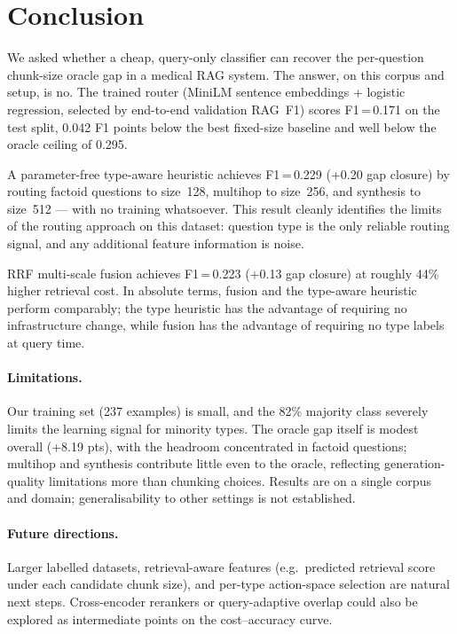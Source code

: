 \documentclass{article}
\begin{document}
\section{Conclusion}

We asked whether a cheap, query-only classifier can recover the per-question
chunk-size oracle gap in a medical RAG system. The answer, on this corpus
and setup, is no. The trained router (MiniLM sentence embeddings + logistic
regression, selected by end-to-end validation RAG~F1) scores F1\,=\,0.171
on the test split, 0.042 F1 points below the best fixed-size baseline and
well below the oracle ceiling of 0.295.

A parameter-free type-aware heuristic achieves F1\,=\,0.229 (+0.20 gap
closure) by routing factoid questions to size~128, multihop to size~256, and
synthesis to size~512 --- with no training whatsoever.
This result cleanly identifies the limits of the routing approach on this
dataset: question type is the only reliable routing signal, and any
additional feature information is noise.

RRF multi-scale fusion achieves F1\,=\,0.223 (+0.13 gap closure) at roughly
44\% higher retrieval cost. In absolute terms, fusion and the type-aware
heuristic perform comparably; the type heuristic has the advantage of
requiring no infrastructure change, while fusion has the advantage of
requiring no type labels at query time.

\paragraph{Limitations.}
Our training set (237 examples) is small, and the 82\% majority class
severely limits the learning signal for minority types.
The oracle gap itself is modest overall (+8.19 pts), with the headroom
concentrated in factoid questions; multihop and synthesis contribute little
even to the oracle, reflecting generation-quality limitations more than
chunking choices.
Results are on a single corpus and domain; generalisability to other
settings is not established.

\paragraph{Future directions.}
Larger labelled datasets, retrieval-aware features (e.g.\ predicted
retrieval score under each candidate chunk size), and per-type action-space
selection are natural next steps.
Cross-encoder rerankers or query-adaptive overlap could also be explored
as intermediate points on the cost--accuracy curve.
\end{document}
